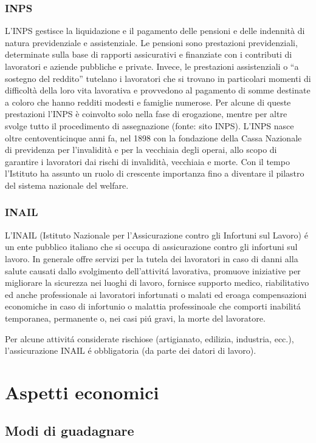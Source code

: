 \documentclass{article}
\begin{document}
\subsubsection{INPS}
L’INPS gestisce la liquidazione e il pagamento delle pensioni e delle indennità di natura previdenziale e assistenziale. Le pensioni sono prestazioni previdenziali, determinate sulla base di rapporti assicurativi e finanziate con i contributi di lavoratori e aziende pubbliche e private. Invece, le prestazioni assistenziali o “a sostegno del reddito” tutelano i lavoratori che si trovano in particolari momenti di difficoltà della loro vita lavorativa e provvedono al pagamento di somme destinate a coloro che hanno redditi modesti e famiglie numerose. Per alcune di queste prestazioni l’INPS è coinvolto solo nella fase di erogazione, mentre per altre svolge tutto il procedimento di assegnazione (fonte: sito INPS). L’INPS nasce oltre centoventicinque anni fa, nel 1898 con la fondazione della Cassa Nazionale di previdenza per l'invalidità e per la vecchiaia degli operai, allo scopo di garantire i lavoratori dai rischi di invalidità, vecchiaia e morte. Con il tempo l’Istituto ha assunto un ruolo di crescente importanza fino a diventare il pilastro del sistema nazionale del welfare.

\subsubsection{INAIL}
L'INAIL (Istituto Nazionale per l'Assicurazione contro gli Infortuni sul Lavoro) \'e un ente pubblico italiano che si occupa di assicurazione contro gli infortuni sul lavoro.
In generale offre servizi per la tutela dei lavoratori in caso di danni alla salute causati dallo svolgimento dell'attivit\'a lavorativa, promuove iniziative per migliorare la sicurezza nei luoghi di lavoro, 
fornisce supporto medico, riabilitativo ed anche professionale ai lavoratori infortunati o malati ed eroaga compensazioni economiche in caso di infortunio o malattia professinoale che comporti inabilit\'a temporanea, permanente o, nei casi pi\'u gravi, la morte del lavoratore.

Per alcune attivit\'a considerate rischiose (artigianato, edilizia, industria, ecc.), l'assicurazione INAIL \'e obbligatoria (da parte dei datori di lavoro).

\section{Aspetti economici}
\subsection{Modi di guadagnare}
\end{document}
